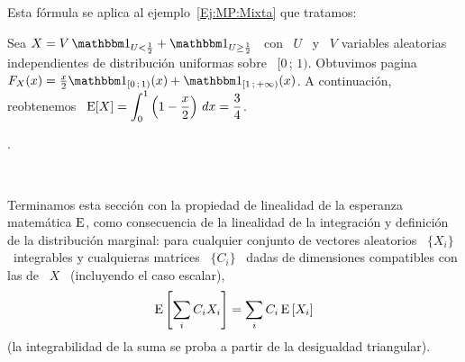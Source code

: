 {Esta f\'ormula se aplica al ejemplo~\ref{Ej:MP:Mixta} que tratamos:
%
\begin{ejemplo}\label{Ej:MP:EspMixtaPositiva}
  Sea $X = V \,  \un_{U < \frac12} + \un_{U \ge \frac12}$ \ con  \ $U$ \ y \ $V$
  variables aleatorias independientes de distribuci\'on uniformas sobre \ $[0 \,
  ;  \,  1)$. Obtuvimos  pagina~\pageref{Ej:MP:Mixta}  \  $F_X(x) =  \frac{x}{2}
  \un_{[0 \,  ; \, 1)}(x)  + \un_{[1 \,  ; \, +\infty)}(x)$.   A continuaci\'on,
  reobtenemos \ $\displaystyle \operatorname{E}[X] = \int_0^1 \left( 1 - \frac{x}{2} \right)
  \, dx = \frac34$.
\end{ejemplo}.

\

Terminamos  esta  secci\'on con  la  propiedad  de  linealidad de  la  esperanza
matem\'atica $\operatorname{E}$,  como consecuencia de  la linealidad de la  integraci\'on y
definici\'on de la distribuci\'on  marginal: para cualquier conjunto de vectores
aleatorios \ $\{  X_i \}$ \ integrables  y cualquieras matrices \ $\{  C_i \}$ \
dadas  de  dimensiones compatibles  con  las  de \  $X$  \  (incluyendo el  caso
escalar),
%
\[
\operatorname{E}\left[ \sum_i C_i X_i \right] = \sum_i C_i \operatorname{E}\left[ X_i \right]
\]
%
(la integrabilidad de la suma se proba a partir de la desigualdad triangular).
}



